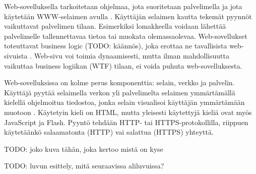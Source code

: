 Web-sovelluksella tarkoitetaan ohjelmaa, jota suoritetaan palvelimella ja jota käytetään WWW-selaimen avulla \cite{uml}. Käyttäjän selaimen kautta tekemät pyynnöt vaikuttavat palvelimen tilaan. Esimerkiksi lomakkeella voidaan lähettää palvelimelle tallennettavaa tietoa tai muokata olemassaolevaa. Web-sovellukset toteuttavat business logic (TODO: käännös), joka erottaa ne tavallisista web-sivuista \cite{uml}. Web-sivu voi toimia dynaamisesti, mutta ilman mahdollisuutta vaikuttaa business logiikan (WTF) tilaan, ei voida puhuta web-sovelluksesta.

Web-sovelluksissa on kolme perus komponenttia: selain, verkko ja palvelin. Käyttäjä pyytää selaimella verkon yli palvelimelta selaimen ymmärtämällä kielellä ohjelmoitua tiedostoa, jonka selain visualisoi käyttäjän ymmärtämään muotoon \cite{uml}. Käytetyin kieli on HTML, mutta yleisesti käytettyjä kieliä ovat myös JavaScript ja Flash. Pyyntö tehdään HTTP- tai HTTPS-protokollilla, riippuen käytetäänkö salaamatonta (HTTP) vai salattua (HTTPS) yhteyttä.

TODO: joko kuva tähän, joka kertoo mistä on kyse

TODO: luvun esittely, mitä seuraavissa aliluvuissa?
